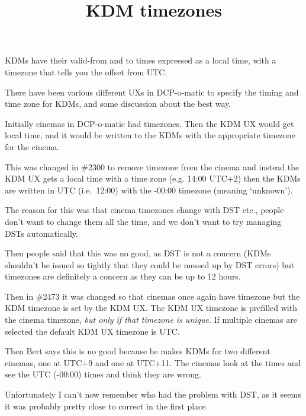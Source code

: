 \documentclass{article}
\title{KDM timezones}
\author{}
\date{}
\begin{document}
\maketitle

KDMs have their valid-from and to times expressed as a local time, with a timezone that tells you the offset from UTC.

There have been various different UXs in DCP-o-matic to specify the timing and time zone for KDMs, and some discussion
about the best way.

Initially cinemas in DCP-o-matic had timezones.  Then the KDM UX would get local time, and it would be written to the
KDMs with the appropriate timezone for the cinema.

This was changed in \#2300 to remove timezone from the cinema and instead the KDM UX gets a local time with a time zone
(e.g. 14:00 UTC+2) then the KDMs are written in UTC (i.e.\ 12:00) with the -00:00 timezone (meaning `unknown').

The reason for this was that cinema timezones change with DST etc., people don't want to change them all the time, and
we don't want to try managing DSTs automatically.

Then people said that this was no good, as DST is not a concern (KDMs shouldn't be issued so tightly that they could
be messed up by DST errors) but timezones are definitely a concern as they can be up to 12 hours.

Then in \#2473 it was changed so that cinemas once again have timezone but the KDM timezone is set by the KDM UX.
The KDM UX timezone is prefilled with the cinema timezone, \emph{but only if that timezone is unique}.  If multiple
cinemas are selected the default KDM UX timezone is UTC.

Then Bert says this is no good because he makes KDMs for two different cinemas, one at UTC+9 and one at UTC+11.
The cinemas look at the times and see the UTC (-00:00) times and think they are wrong.

Unfortunately I can't now remember who had the problem with DST, as it seems it was probably pretty close to correct
in the first place.
\end{document}
